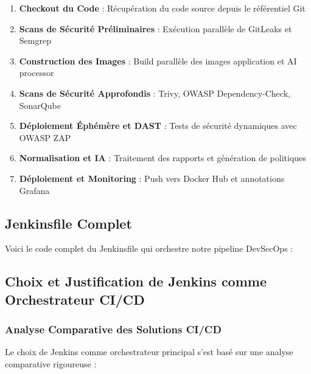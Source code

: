 \documentclass[12pt,a4paper]{report}
\begin{document}
\begin{enumerate}
    \item \textbf{Checkout du Code} : Récupération du code source depuis le référentiel Git
    \item \textbf{Scans de Sécurité Préliminaires} : Exécution parallèle de GitLeaks et Semgrep
    \item \textbf{Construction des Images} : Build parallèle des images application et AI processor
    \item \textbf{Scans de Sécurité Approfondis} : Trivy, OWASP Dependency-Check, SonarQube
    \item \textbf{Déploiement Éphémère et DAST} : Tests de sécurité dynamiques avec OWASP ZAP
    \item \textbf{Normalisation et IA} : Traitement des rapports et génération de politiques
    \item \textbf{Déploiement et Monitoring} : Push vers Docker Hub et annotations Grafana
\end{enumerate}

\subsection{Jenkinsfile Complet}

Voici le code complet du Jenkinsfile qui orchestre notre pipeline DevSecOps :

\subsection{Choix et Justification de Jenkins comme Orchestrateur CI/CD}

\subsubsection{Analyse Comparative des Solutions CI/CD}

Le choix de Jenkins comme orchestrateur principal s'est basé sur une analyse comparative rigoureuse :
\end{document}
